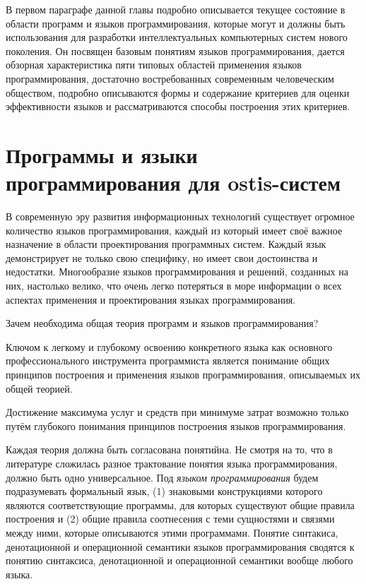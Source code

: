 В первом параграфе данной главы подробно описывается текущее состояние в области программ и языков программирования,
которые могут и должны быть использования для разработки интеллектуальных компьютерных систем нового поколения. Он
посвящен базовым понятиям языков программирования, дается обзорная характеристика пяти типовых областей применения
языков программирования, достаточно востребованных современным человеческим обществом, подробно описываются формы и
содержание критериев для оценки эффективности языков и рассматриваются способы построения этих критериев.


\section{Программы и языки программирования для ostis-систем}

В современную эру развития информационных технологий существует огромное количество языков программирования, каждый из
который имеет своё важное назначение в области проектирования программных систем. Каждый язык демонстрирует не только
свою специфику, но имеет свои достоинства и недостатки. Многообразие языков программирования и решений, созданных
на них, настолько велико, что очень легко потеряться в море информации о всех аспектах применения и проектирования
языках программирования.

Зачем необходима общая теория программ и языков программирования?
\begin{scnnumerize}
    \item Ключом к легкому и глубокому освоению конкретного языка как основного профессионального инструмента
    программиста является понимание общих принципов построения и применения языков программирования, описываемых их
    общей теорией.
    \item Достижение максимума услуг и средств при минимуме затрат возможно только путём глубокого понимания принципов
    построения языков программирования.
\end{scnnumerize}

Каждая теория должна быть согласована понятийна. Не смотря на то, что в литературе сложилась разное трактование понятия
языка программирования, должно быть одно универсальное. Под \textit{языком программирования} будем подразумевать
формальный язык, (1) знаковыми конструкциями которого являются соответствующие программы, для которых существуют
общие правила построения и (2) общие правила соотнесения с теми сущностями и связями между ними, которые описываются
этими программами. Понятие синтакиса, денотационной и операционной семантики языков программирования сводятся к
понятию синтаксиса, денотационной и операционной семантики вообще любого языка.

